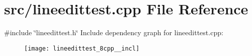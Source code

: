 \section{src/lineedittest.cpp File Reference}
\label{lineedittest_8cpp}
{\ttfamily \#include \char`\"{}lineedittest.\+h\char`\"{}}\newline
Include dependency graph for lineedittest.\+cpp\+:\nopagebreak
\begin{figure}[H]
\begin{center}
\leavevmode
\texttt{[image: lineedittest\_8cpp\_\_incl]}
\end{center}
\end{figure}

